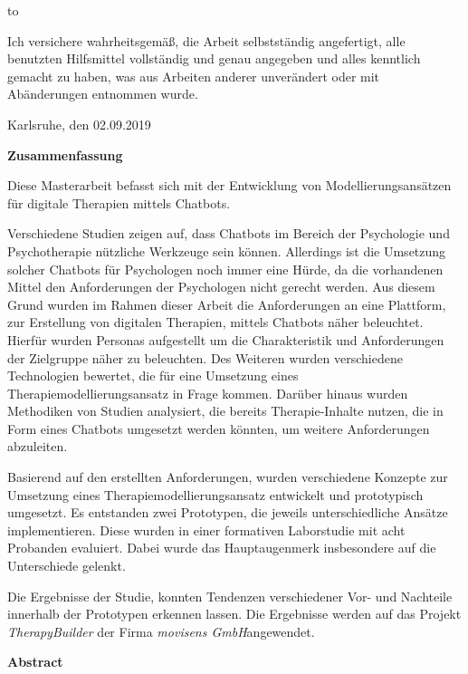 \thispagestyle{empty}
\vspace*{42\baselineskip}
\hbox to \textwidth{\hrulefill}
\par
Ich versichere wahrheitsgemäß, die Arbeit selbstständig angefertigt, alle benutzten Hilfsmittel vollständig und genau angegeben und alles kenntlich gemacht zu haben, was aus Arbeiten anderer unverändert oder mit Abänderungen entnommen wurde.

Karlsruhe, den 02.09.2019

\cleardoublepage

\vspace*{1em}
\begin{center}
	\textbf{Zusammenfassung}
\end{center}
\par
Diese Masterarbeit befasst sich mit der Entwicklung von Modellierungsansätzen für digitale Therapien mittels Chatbots. 

Verschiedene Studien zeigen auf, dass Chatbots im Bereich der Psychologie und Psychotherapie nützliche Werkzeuge sein können. Allerdings ist die Umsetzung solcher Chatbots für Psychologen noch immer eine Hürde, da die vorhandenen Mittel den Anforderungen der Psychologen nicht gerecht werden. 
Aus diesem Grund wurden im Rahmen dieser Arbeit die Anforderungen an eine Plattform, zur Erstellung von digitalen Therapien, mittels Chatbots näher beleuchtet. Hierfür wurden Personas aufgestellt um die Charakteristik und Anforderungen der Zielgruppe näher zu beleuchten. Des Weiteren wurden verschiedene Technologien bewertet, die für eine Umsetzung eines Therapiemodellierungsansatz in Frage kommen. Darüber hinaus wurden Methodiken von Studien analysiert, die bereits Therapie-Inhalte nutzen, die in Form eines Chatbots umgesetzt werden könnten, um weitere Anforderungen abzuleiten.

Basierend auf den erstellten Anforderungen, wurden verschiedene Konzepte zur Umsetzung eines Therapiemodellierungsansatz entwickelt und prototypisch umgesetzt. Es entstanden zwei Prototypen, die jeweils unterschiedliche Ansätze implementieren. Diese wurden in einer formativen Laborstudie mit acht Probanden evaluiert. Dabei wurde das Hauptaugenmerk insbesondere auf die Unterschiede gelenkt. 

Die Ergebnisse der Studie, konnten Tendenzen verschiedener Vor- und Nachteile innerhalb der Prototypen erkennen lassen. Die Ergebnisse werden auf das Projekt \emph{TherapyBuilder} der Firma \emph{movisens GmbH}angewendet.

\cleardoublepage
\vspace*{1em}
\begin{center}
	\textbf{Abstract}
\end{center}
\par

